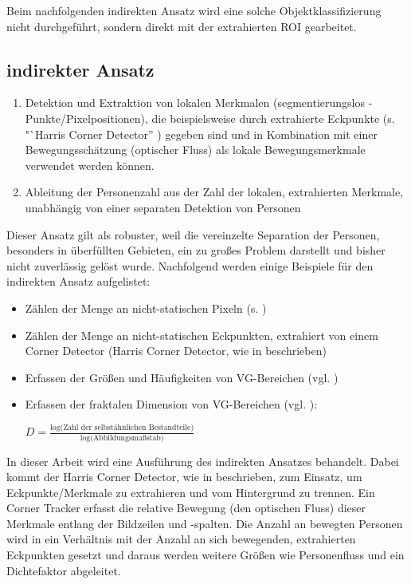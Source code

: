 Beim nachfolgenden indirekten Ansatz wird eine solche Objektklassifizierung nicht durchgeführt, sondern direkt mit der extrahierten ROI gearbeitet.

\subsection{indirekter Ansatz}

\begin{enumerate}
\item Detektion und Extraktion von lokalen Merkmalen (segmentierungslos - \zb Punkte/Pixelpositionen), die beispielsweise durch extrahierte Eckpunkte (s. "`Harris Corner Detector'' \cite{albiol}) gegeben sind und in Kombination mit einer Bewegungsschätzung (optischer Fluss) als lokale Bewegungsmerkmale verwendet werden können.
\item Ableitung der Personenzahl aus der Zahl der lokalen, extrahierten Merkmale, unabhängig von einer separaten Detektion von Personen
\end{enumerate}

Dieser Ansatz gilt als robuster, weil die vereinzelte Separation der Personen, besonders in überfüllten Gebieten, ein zu großes Problem darstellt und bisher nicht zuverlässig gelöst wurde.
\vskip 5pt
Nachfolgend werden einige Beispiele für den indirekten Ansatz aufgelistet:

\begin{itemize}

\item Zählen der Menge an nicht-statischen Pixeln (s. \cite{cho})

\item Zählen der Menge an nicht-statischen Eckpunkten, extrahiert von einem Corner Detector (\zb Harris Corner Detector, wie in \cite{albiol} beschrieben)

\item Erfassen der Größen und Häufigkeiten von VG-Bereichen (vgl. \cite{kong})

\item Erfassen der fraktalen Dimension von VG-Bereichen (vgl. \cite{marana}):\\
\begin{center}
$D = \frac{\text{log(Zahl der selbstähnlichen Bestandteile)}}{\text{log(Abbildungsmaßstab)}}$
\end{center}
\end{itemize}

\vskip 5pt
In dieser Arbeit wird eine Ausführung des indirekten Ansatzes behandelt. Dabei kommt der Harris Corner Detector, wie in \cite{albiol} beschrieben, zum Einsatz, um Eckpunkte/Merkmale zu extrahieren und vom Hintergrund zu trennen. Ein Corner Tracker erfasst die relative Bewegung (den optischen Fluss) dieser Merkmale entlang der Bildzeilen und -spalten. Die Anzahl an bewegten Personen wird in ein Verhältnis mit der Anzahl an sich bewegenden, extrahierten Eckpunkten gesetzt und daraus werden weitere Größen wie Personenfluss und ein Dichtefaktor abgeleitet.

